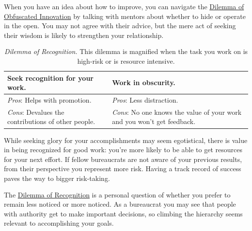 When you have an idea about how to improve, you can navigate the \hyperref[table:dilemma-personal-innovate-open-obscure]{Dilemma of Obfuscated Innovation} by talking with mentors about whether to hide or operate in the open. You may not agree with their advice, but the mere act of seeking their wisdom is likely to strengthen your relationship. 



\begin{center}
\begin{table}[H] %
\begin{tabular}{ | m{\dilemmatablewidth}| m{\dilemmatablewidth} | } 
  \hline
  \textbf{Seek recognition for your work.} &
  \textbf{Work in obscurity.} \\
  \hline
  \textit{Pros}: Helps with promotion. & 
  \textit{Pros}: Less distraction. \\
  \hline
  \textit{Cons}: Devalues the contributions of other people. & 
  \textit{Cons}: No one knows the value of your work and you won't get feedback. \\
  \hline
\end{tabular}
\caption{
\textit{Dilemma of Recognition.}
This dilemma is magnified when the task you work on is high-risk or is resource intensive. 
}
\label{table:dilemma-personal-recognition-obscurity}
\end{table}
\end{center}

While seeking glory for your accomplishments may seem egotistical, there is value in being recognized for good work: you're more likely to be able to get resources for your next effort. If fellow bureaucrats are not aware of your previous results, from their perspective you represent more risk. Having a track record of success paves the way to bigger risk-taking.

The \hyperref[table:dilemma-personal-recognition-obscurity]{Dilemma of Recognition} 
\iftoggle{printedonpaper}{ (\ref{table:dilemma-personal-recognition-obscurity})}{} is 
a personal question of whether you prefer to remain less noticed or more noticed. As a bureaucrat you may see that people with authority get to make important decisions, so climbing the hierarchy seems relevant to accomplishing your goals. 


